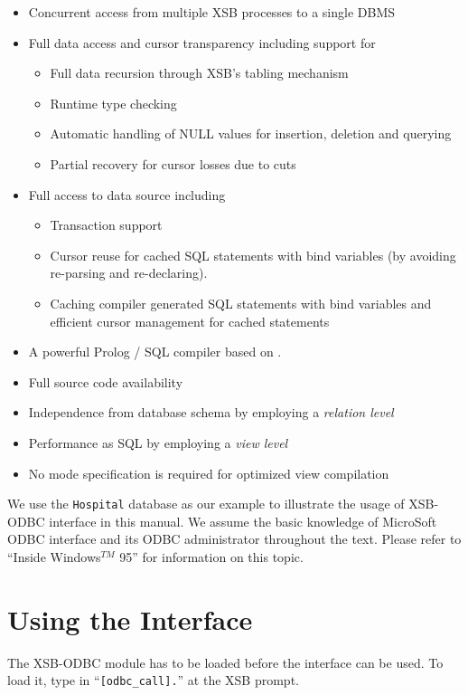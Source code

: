 \begin{itemize} 
\item Concurrent access from multiple XSB processes to a single DBMS
\item Full data access and cursor transparency including support for
	\begin{itemize}
	\item Full data recursion through XSB's tabling mechanism
	\item Runtime type checking
	\item Automatic handling of NULL values for insertion, 
		deletion and querying
	\item Partial recovery for cursor losses due to cuts
	\end{itemize}
\item Full access to data source including
	\begin{itemize}
	\item Transaction support
	\item Cursor reuse for cached SQL statements 
		with bind variables (by avoiding re-parsing and re-declaring).
	\item Caching compiler generated SQL statements with bind variables 
		and efficient cursor management for cached statements
	\end{itemize}
\item A powerful Prolog / SQL compiler based on \cite{Dra92}.
\item Full source code availability
\item Independence from database schema by employing a {\it relation level}
\item Performance as SQL by employing a {\it view level} 
\item No mode specification is required for optimized view compilation
\end{itemize}

We use the {\tt Hospital} database as our example to illustrate 
the usage of XSB-ODBC interface in this manual. We assume the basic 
knowledge of MicroSoft ODBC interface and its ODBC administrator 
throughout the text.  Please refer to ``Inside Windows$^{TM}$ 95''
 for information on this topic.

\section{Using the Interface}

The XSB-ODBC module has to be loaded before the interface can be used.  
To load it, type in ``{\tt [odbc\_call].}'' at the XSB prompt.

